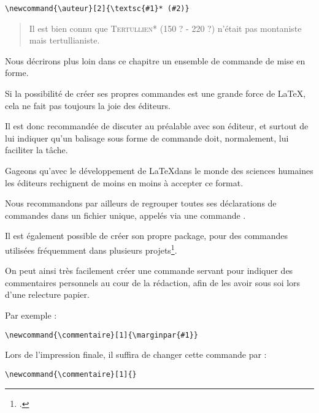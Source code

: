 \begin{verbatim}
\newcommand{\auteur}[2]{\textsc{#1}* (#2)}
\end{verbatim}

\renewcommand{\auteur}[2]{\textsc{#1}* (#2)}

\begin{quotation}
Il est bien connu que \auteur{Tertullien}{150 ? - 220 ?}
n'était pas montaniste mais tertullianiste.
\end{quotation}

Nous décrirons plus loin dans ce chapitre un ensemble de commande de mise en forme.

\begin{attention}
	Si la possibilité de créer ses propres commandes est une grande force de \LaTeX, cela ne fait pas toujours la joie des éditeurs. 
	
	Il est donc recommandée de discuter au préalable avec son éditeur, et surtout de lui indiquer qu'un balisage sous forme de commande doit, normalement, lui faciliter la tâche.
	
	Gageons qu'avec le développement  de \LaTeX dans le monde des sciences humaines les éditeurs rechignent de moins en moins à accepter ce format.
	
	Nous recommandons par ailleurs de regrouper toutes ses déclarations de commandes dans un fichier unique, appelés via une commande .
	
	Il est également possible de créer son propre package, pour des commandes utilisées fréquemment dans plusieurs projets\footcite[Ceci dépasserais le cadre de cet ouvrage : je renvois à d'autres documents. Par exemples][]{creer_sty}.
\end{attention}


\begin{anedocte}\label{commentaireredac}
On peut ainsi très facilement créer une commande  servant pour indiquer des commentaires personnels au cour de la rédaction, afin de les avoir sous soi lors d'une relecture papier.

Par exemple :

\begin{verbatim}
\newcommand{\commentaire}[1]{\marginpar{#1}}
\end{verbatim}

Lors de l'impression finale, il suffira de changer cette commande par :
\begin{verbatim}
\newcommand{\commentaire}[1]{}
\end{verbatim}

\end{anedocte}


